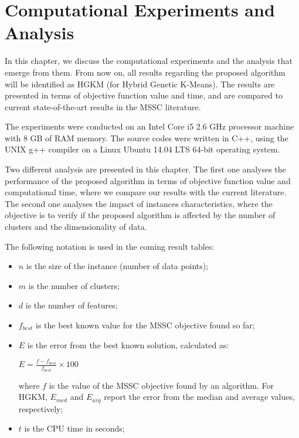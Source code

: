 \chapter{Computational Experiments and Analysis}
\label{chap:experiments}
In this chapter, we discuss the computational experiments and the analysis that emerge from them. From now on, all results regarding the proposed algorithm will be identified as HGKM (for Hybrid Genetic K-Means). The results are presented in terms of objective function value and time, and are compared to current state-of-the-art results in the MSSC literature.

The experiments were conducted on an Intel Core i5 2.6 GHz processor machine with 8 GB of RAM memory. The source codes were written in C++, using the UNIX g++ compiler on a Linux Ubuntu 14.04 LTS 64-bit operating system.

Two different analysis are presented in this chapter. The first one analyses the performance of the proposed algorithm in terms of objective function value and computational time, where we compare our results with the current literature. The second one analyses the impact of instances characteristics, where the objective is to verify if the proposed algorithm is affected by the number of clusters and the dimensionality of data.

The following notation is used in the coming result tables:

\begin{itemize}
	\item $n$ is the size of the instance (number of data points);
	
	\item $m$ is the number of clusters;

	\item $d$ is the number of features;
	
	\item $f_{best}$ is the best known value for the MSSC objective found so far;

	\item $E$ is the error from the best known solution, calculated as:

		\begin{center}
		\large
			$E = \frac{f - f_{best}}{f_{best}} \times 100$
		\end{center}
		
	where $f$ is the value of the MSSC objective found by an algorithm. For HGKM, $E_{med}$ and $E_{avg}$ report the error from the median and average values, respectively;
	
	\item $t$ is the CPU time in seconds;

\end{itemize}

